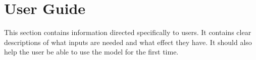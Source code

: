 
\section{User Guide}
This section contains information directed specifically to users. It contains clear descriptions of what inputs are needed and what effect they have. It should also help the user be able to use the model for the first time.
